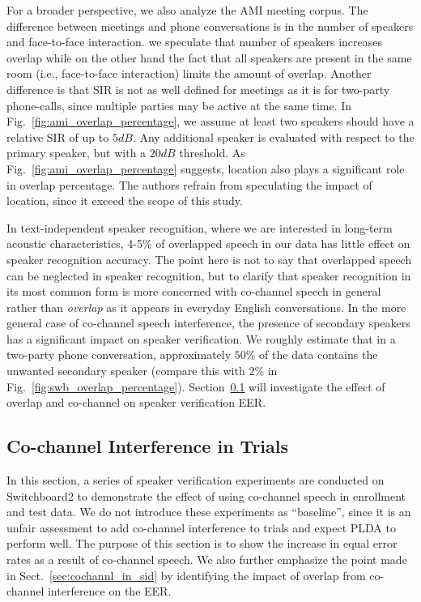 For a broader perspective, we also analyze the AMI meeting corpus. 
The difference between meetings and phone conversations is in the number of speakers and face-to-face interaction. 
we speculate that number of speakers increases overlap while on the other hand the fact that all speakers are present in the same room (i.e., face-to-face interaction) limits the amount of overlap. 
Another difference is that SIR is not as well defined for meetings as it is for two-party phone-calls, since multiple parties may be active at the same time. 
In Fig.~\ref{fig:ami_overlap_percentage}, we assume at least two speakers should have a relative SIR of up to $5dB$. 
Any additional speaker is evaluated with respect to the primary speaker, but with a $20dB$ threshold. 
As Fig.~\ref{fig:ami_overlap_percentage} suggests, location also plays a significant role in overlap percentage. 
The authors refrain from speculating the impact of location, since it exceed the scope of this study. 

In text-independent speaker recognition, where we are interested in long-term acoustic characteristics, 4-5\% of overlapped speech in our data has little effect on speaker recognition accuracy. 
The point here is not to say that overlapped speech can be neglected in speaker recognition, but to clarify that speaker recognition in its most common form is more concerned with co-channel speech in general rather than {\it overlap} as it appears in everyday English conversations. 
In the more general case of co-channel speech interference, the presence of secondary speakers has a significant impact on speaker verification. 
We roughly estimate that in a two-party phone conversation, approximately $50\%$ of the data contains the unwanted secondary speaker (compare this with $2\%$ in Fig.~\ref{fig:swb_overlap_percentage}). 
Section~\ref{ssec:cch_in_trials} will investigate the effect of overlap and co-channel on speaker verification EER. 



\subsection{Co-channel Interference in Trials}
\label{ssec:cch_in_trials}
In this section, a series of speaker verification experiments are conducted on Switchboard2 to demonstrate the effect of using co-channel speech in enrollment and test data. 
We do not introduce these experiments as ``baseline'', since it is an unfair assessment to add co-channel interference to trials and expect PLDA to perform well. 
The purpose of this section is to show the increase in equal error rates as a result of co-channel speech. 
We also further emphasize the point made in Sect.~\ref{sec:cochannl_in_sid} by identifying the impact of overlap from co-channel interference on the EER. 

